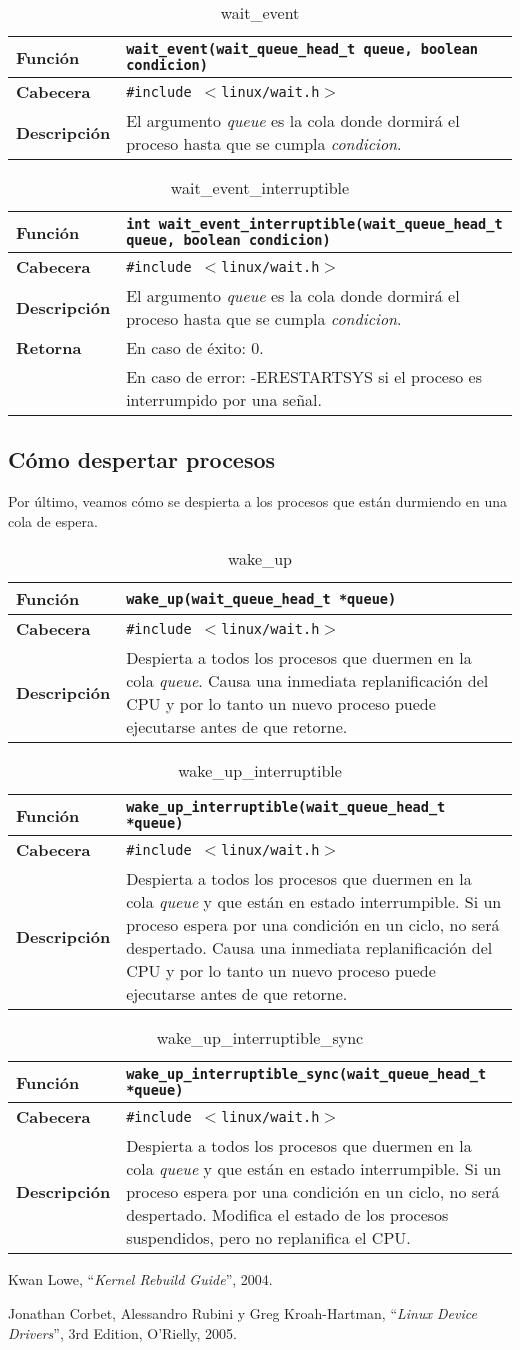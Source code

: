\documentclass[12pt,a4paper,spanish]{article}
\newenvironment{funcdesc}[1]
	{	
		\begin{table}[!htp]
		\caption{ {#1} }
		\begin{small}
		\begin{tabular}{ | l | p{10cm} | } \hline
	}
	{
		\end{tabular}
		\end{small}
		\end{table}
	}
\newcommand{\funcion}[1] {\textbf {Función} &  \texttt{{#1}} \\ \hline}
\newcommand{\cabecera}[1] {\textbf {Cabecera} &  \texttt{\#include $<${#1}$>$} \\ \hline}
\newcommand{\descrip}[1] {\textbf {Descripción} &  {#1} \\ \hline}
\newcommand{\return}[2]{ \textbf{Retorna} & En caso de éxito: {#1} \\ & En caso de error: {#2} \\ \hline }
\begin{document}
\begin{funcdesc}{wait\_event}
\funcion{wait\_event(wait\_queue\_head\_t queue, boolean condicion)}
\cabecera{linux/wait.h}
\descrip{El argumento \textit{queue} es la cola donde dormirá el proceso hasta
que se cumpla \textit{condicion}.}
\end{funcdesc}

\begin{funcdesc}{wait\_event\_interruptible}
\funcion{int wait\_event\_interruptible(wait\_queue\_head\_t queue, boolean
condicion)}
\cabecera{linux/wait.h}
\descrip{El argumento \textit{queue} es la cola donde dormirá el proceso hasta
que se cumpla \textit{condicion}.}
\return{0.}{-ERESTARTSYS si el proceso es interrumpido por una señal.}
\end{funcdesc}

\subsection{Cómo despertar procesos}

Por último, veamos cómo se despierta a los procesos que están durmiendo en una cola de espera. 

\begin{funcdesc}{wake\_up}
\funcion{wake\_up(wait\_queue\_head\_t *queue)}
\cabecera{linux/wait.h}
\descrip{Despierta a todos los procesos que duermen en la cola \textit{queue}.
Causa una inmediata replanificación del CPU y por lo tanto un nuevo proceso
puede ejecutarse antes de que retorne.}
\end{funcdesc}

\begin{funcdesc}{wake\_up\_interruptible}
\funcion{wake\_up\_interruptible(wait\_queue\_head\_t *queue)}
\cabecera{linux/wait.h}
\descrip{Despierta a todos los procesos que duermen en la cola \textit{queue}
y que están en estado interrumpible. Si un proceso espera por una condición en
un ciclo, no será despertado. Causa una inmediata replanificación del CPU y por
lo tanto un nuevo proceso puede ejecutarse antes de que retorne.}
\end{funcdesc}

\begin{funcdesc}{wake\_up\_interruptible\_sync}
\funcion{wake\_up\_interruptible\_sync(wait\_queue\_head\_t *queue)}
\cabecera{linux/wait.h}
\descrip{Despierta a todos los procesos que duermen en la cola \textit{queue}
y que están en estado interrumpible. Si un proceso espera por una condición en
un ciclo, no será despertado. Modifica el estado de los procesos suspendidos,
pero no replanifica el CPU.}
\end{funcdesc}

\begin{thebibliography}{99}

 Kwan Lowe, ``\textit{Kernel Rebuild Guide}'', 2004.

 Jonathan Corbet, Alessandro Rubini y Greg Kroah-Hartman, ``\textit{Linux Device Drivers}'', 3rd Edition, O'Rielly, 2005.

\end{thebibliography}
\end{document}
